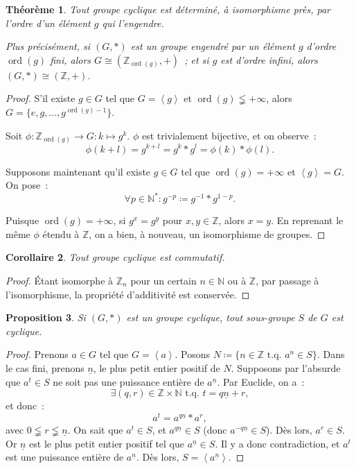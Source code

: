 \documentclass{article}
\newtheorem{thm}{Théorème}[section]
\newtheorem{prp}[thm]{Proposition}
\newtheorem{cor}[thm]{Corollaire}
\theoremstyle{definition}
\theoremstyle{remark}
\DeclareMathOperator{\ord}{ord}
\newcommand{\Z}{\mathbb Z}
\newcommand{\N}{\mathbb N}
\newcommand{\tq}{\text{ t.q. }}
\newcommand{\simeqq}{\cong}
\newcommand{\eng}[1]{\left\langle#1\right\rangle}
\begin{document}
		\begin{thm} Tout groupe cyclique est déterminé, à isomorphisme près, par l'ordre d'un élément $g$ qui l'engendre.

		Plus précisément, si $(G, *)$ est un groupe engendré par un élément $g$ d'ordre $\ord(g)$ fini, alors $G \simeqq (\Z_{\ord(g)}, +)$~; et si $g$ est
		d'ordre infini, alors $(G, *) \simeqq (\Z, +)$.
		\end{thm}

		\begin{proof} S'il existe $g \in G$ tel que $G = \eng g$ et $\ord(g) \lneqq +\infty$, alors $G = \{e, g, \ldots, g^{\ord(g)-1}\}$.

		Soit $\phi : \Z_{\ord(g)} \to G : k \mapsto g^k$. $\phi$ est trivialement bijective, et on observe~:
		\[\phi(k+l) = g^{k+l} = g^k * g^l = \phi(k) * \phi(l).\]

		Supposons maintenant qu'il existe $g \in G$ tel que $\ord(g) = +\infty$ et $\eng g = G$. On pose~:
		\[\forall p \in \N^* : g^{-p} \coloneqq g^{-1} * g^{1-p}.\]

		Puisque $\ord(g) = +\infty$, si $g^x = g^y$ pour $x, y \in \Z$, alors $x=y$. En reprenant le même $\phi$ étendu à $\Z$, on a bien, à nouveau, un
		isomorphisme de groupes.
		\end{proof}

		\begin{cor} Tout groupe cyclique est commutatif.
		\end{cor}

		\begin{proof} Étant isomorphe à $\Z_n$ pour un certain $n \in \N$ ou à $\Z$, par passage à l'isomorphisme, la propriété d'additivité est conservée.
		\end{proof}

		\begin{prp} Si $(G, *)$ est un groupe cyclique, tout sous-groupe $S$ de $G$ est cyclique.
		\end{prp}

		\begin{proof} Prenons $a \in G$ tel que $G = \eng a$. Posons $N \coloneqq \{n \in \Z \tq a^n \in S\}$. Dans le cas fini, prenons $\underline n$, le
		plus petit entier positif de $N$. Supposons par l'absurde que $a^t \in S$ ne soit pas une puissance entière de $a^{\underline n}$. Par Euclide, on a~:
		\[\exists (q, r) \in \Z \times \N \tq t = q\underline n + r,\]
		et donc~:
		\[a^t = a^{q\underline n} * a^r,\]
		avec $0 \lneqq r \lneqq \underline n$. On sait que $a^t \in S$, et $a^{q\underline n} \in S$ (donc $a^{-q\underline n} \in S$). Dès lors, $a^r \in S$.
		Or $\underline n$ est le plus petit entier positif tel que $a^{\underline n} \in S$. Il y a donc contradiction, et $a^t$ est une puissance entière de
		$a^{\underline n}$. Dès lors, $S = \eng {a^{\underline n}}$.
		\end{proof}
\end{document}
